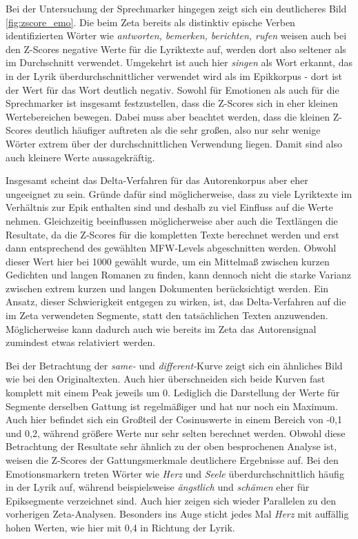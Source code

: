 \documentclass[a4paper,10p]{article}
\begin{document}
Bei der Untersuchung der Sprechmarker hingegen zeigt sich ein deutlicheres Bild \ref{fig:zscore_emo}. Die beim Zeta bereits als distinktiv epische Verben identifizierten Wörter wie \textit{antworten, bemerken, berichten, rufen} weisen auch bei den Z-Scores negative Werte für die Lyriktexte auf, werden dort also seltener als im Durchschnitt verwendet. Umgekehrt ist auch hier \textit{singen} als Wort erkannt, das in der Lyrik überdurchschnittlicher verwendet wird als im Epikkorpus - dort ist der Wert für das Wort deutlich negativ. Sowohl für Emotionen als auch für die Sprechmarker ist insgesamt festzustellen, dass die Z-Scores sich in eher kleinen Wertebereichen bewegen. Dabei muss aber beachtet werden, dass die kleinen Z-Scores deutlich häufiger auftreten als die sehr großen, also nur sehr wenige Wörter extrem über der durchschnittlichen Verwendung liegen. Damit sind also auch kleinere Werte aussagekräftig. \par 

Insgesamt scheint das Delta-Verfahren für das Autorenkorpus aber eher ungeeignet zu sein. Gründe dafür sind möglicherweise, dass zu viele Lyriktexte im Verhältnis zur Epik enthalten sind und deshalb zu viel Einfluss auf die Werte nehmen. Gleichzeitig beeinflussen möglicherweise aber auch die Textlängen die Resultate, da die Z-Scores für die kompletten Texte berechnet werden und erst dann entsprechend des gewählten MFW-Levels abgeschnitten werden. Obwohl dieser Wert hier bei 1000 gewählt wurde, um ein Mittelmaß zwischen kurzen Gedichten und langen Romanen zu finden, kann dennoch nicht die starke Varianz zwischen extrem kurzen und langen Dokumenten berücksichtigt werden. Ein Ansatz, dieser Schwierigkeit entgegen zu wirken, ist, das Delta-Verfahren auf die im Zeta verwendeten Segmente, statt den tatsächlichen Texten anzuwenden. Möglicherweise kann dadurch auch wie bereits im Zeta das Autorensignal zumindest etwas relativiert werden. \par                 

Bei der Betrachtung der \textit{same-} und  \textit{different-}Kurve zeigt sich ein ähnliches Bild wie bei den Originaltexten. Auch hier überschneiden sich beide Kurven fast komplett mit einem Peak jeweils um 0. Lediglich die Darstellung der Werte für Segmente derselben Gattung ist regelmäßiger und hat nur noch ein Maximum. Auch hier befindet sich ein Großteil der Cosinuswerte in einem Bereich von -0,1 und 0,2, während größere Werte nur sehr selten berechnet werden. Obwohl diese Betrachtung der Resultate sehr ähnlich zu der oben besprochenen Analyse ist, weisen die Z-Scores der Gattungsmerkmale deutlichere Ergebnisse auf. Bei den Emotionsmarkern treten Wörter wie \textit{Herz} und \textit{Seele} überdurchschnittlich häufig in der Lyrik auf, während beispielsweise \textit{ängstlich} und \textit{schämen} eher für Epiksegmente verzeichnet sind. Auch hier zeigen sich wieder Parallelen zu den vorherigen Zeta-Analysen. Besonders ins Auge sticht jedes Mal \textit{Herz} mit auffällig hohen Werten, wie hier mit 0,4 in Richtung der Lyrik. \par 
\end{document}
